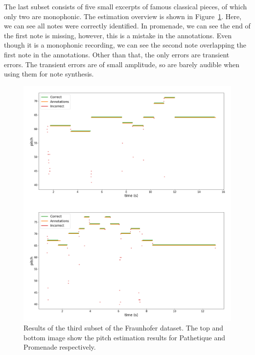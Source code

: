\documentclass[a4paper,10pt,twocolumn]{article}
\begin{document}
The last subset consists of five small excerpts of famous classical pieces, of which only two are monophonic. The estimation overview is shown in Figure~\ref{fig:dat3}. Here, we can see all notes were correctly identified. In promenade, we can see the end of the first note is missing, however, this is a mistake in the annotations. Even though it is a monophonic recording, we can see the second note overlapping the first note in the annotations. Other than that, the only errors are transient errors. The transient errors are of small amplitude, so are barely audible when using them for note synthesis.
\begin{figure}[h]
    \centering
    \includegraphics[width=\linewidth]{fig/dataset3.png}
    \caption{Results of the third subset of the Fraunhofer dataset. The top and bottom image show the pitch estimation results for Pathetique and Promenade respectively.}
    \label{fig:dat3}
\end{figure}
\end{document}
